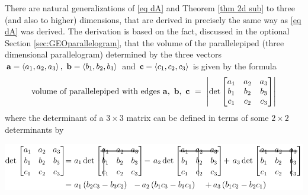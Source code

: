 There are natural generalizations of \eqref{eq dA} and 
Theorem \ref{thm 2d sub} to three (and also to higher) dimensions,
that are derived in precisely the same way as \eqref{eq dA}
was derived. The derivation is based on the fact, discussed in
the optional Section \ref{sec:GEOparallelogram}, that
the volume of the parallelepiped (three dimensional parallelogram) 
%
determined by the three vectors 
$\mathbf{a}=\left< a_1,a_2,a_3\right> ,\ \mathbf{b}=\left< b_1,b_2,b_3\right> $ and 
$\mathbf{c}=\left< c_1,c_2,c_3\right> $ is given by the formula
\begin{align*}
\text{volume of parallelepiped with edges $\va,\ \vb,\ \vc\ 
=\ \left|
\det\left[\begin{matrix}a_1&a_2&a_3\\ b_1&b_2&b_3\\ c_1&c_2&c_3\end{matrix}\right]
\right|$}
\end{align*}
where the determinant of a $3\times 3$ matrix can be defined in terms
of some $2\times 2$ determinants by
      \begin{center}
      \includegraphics{../figs_geometry/det2}%
      \end{center}


